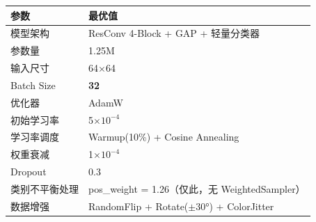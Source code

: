\documentclass[12pt,a4paper]{ctexart}
\begin{document}
\begin{table}[H]
\centering
\begin{tabular}{ll}
\toprule
参数 & 最优值 \\
\midrule
模型架构 & ResConv 4-Block + GAP + 轻量分类器 \\
参数量 & 1.25M \\
输入尺寸 & 64$\times$64 \\
Batch Size & \textbf{32} \\
优化器 & AdamW \\
初始学习率 & 5$\times10^{-4}$ \\
学习率调度 & Warmup(10\%) + Cosine Annealing \\
权重衰减 & 1$\times10^{-4}$ \\
Dropout & 0.3 \\
类别不平衡处理 & pos\_weight = 1.26（仅此，无 WeightedSampler） \\
数据增强 & RandomFlip + Rotate($\pm$30°) + ColorJitter \\
\bottomrule
\end{tabular}
\end{table}
\end{document}
